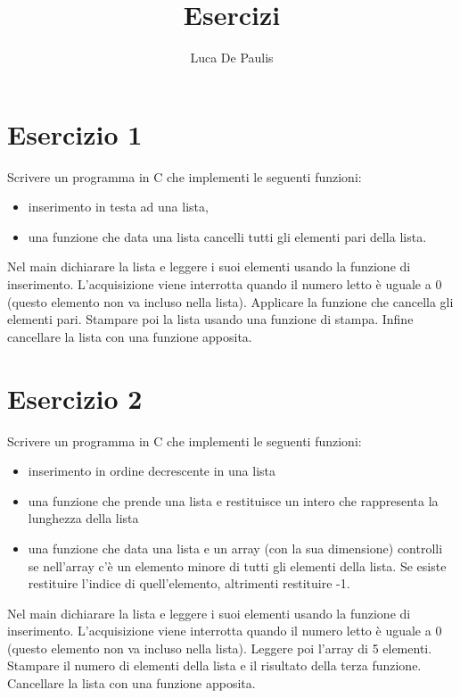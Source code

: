 \documentclass[italian,oneside,headinclude,10pt]{scrartcl}
\begin{document}
\author{Luca De Paulis}
\title{Esercizi}
\maketitle


\section{Esercizio 1}

Scrivere un programma in C che implementi le seguenti funzioni:
\begin{itemize}
    \item inserimento in testa ad una lista,
    \item una funzione che data una lista cancelli tutti gli elementi pari della lista. 
\end{itemize}

Nel main dichiarare la lista e leggere i suoi elementi usando la funzione di inserimento. L'acquisizione viene interrotta quando il numero letto è uguale a $0$ (questo elemento non va incluso nella lista). Applicare la funzione che cancella gli elementi pari. Stampare poi la lista usando una funzione di stampa. Infine cancellare la lista con una funzione apposita.

\section{Esercizio 2}
Scrivere un programma in C che implementi le seguenti funzioni:
\begin{itemize}
    \item inserimento in ordine decrescente in una lista
    \item una funzione che prende una lista e restituisce un intero che rappresenta la lunghezza della lista
    \item una funzione che data una lista e un array (con la sua dimensione) controlli se nell'array c'è un elemento minore di tutti gli elementi della lista. Se esiste restituire l'indice di quell'elemento, altrimenti restituire -1.
\end{itemize}

Nel main dichiarare la lista e leggere i suoi elementi usando la funzione di inserimento. L'acquisizione viene interrotta quando il numero letto è uguale a $0$ (questo elemento non va incluso nella lista). Leggere poi l'array di 5 elementi. Stampare il numero di elementi della lista e il risultato della terza funzione. Cancellare la lista con una funzione apposita.
\end{document}

